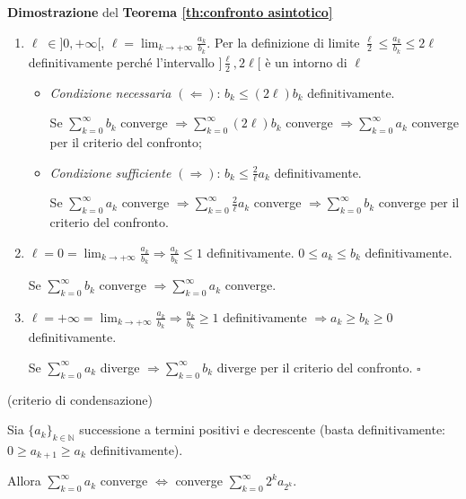 \begin{dembar}
	\textbf{Dimostrazione} del \textbf{Teorema \ref{th:confronto asintotico}}
	\begin{enumerate}
		\item $\ell \; \in ]0,+\infty[$, $\ell = \lim_{k\rightarrow+\infty} \frac{a_k}{b_k}$. Per la definizione di limite $\frac{\ell}{2} \leq \frac{a_k}{b_k} \leq 2\ell$ definitivamente perché l'intervallo $]\frac{\ell}{2}, 2\ell[$ è un intorno di $\ell$
		\begin{itemize}
			\item \textit{Condizione necessaria $(\Leftarrow)$}: $b_k \leq (2\ell) b_k$ definitivamente. 
			
			Se $\sum_{k=0}^\infty b_k$ converge $\Rightarrow \sum_{k=0}^\infty (2\ell) b_k$ converge $\Rightarrow \sum_{k=0}^\infty a_k$ converge per il criterio del confronto;
			
			\item \textit{Condizione sufficiente $(\Rightarrow)$}: $b_k \leq \frac{2}{\ell} a_k$ definitivamente.
			
			Se $\sum_{k=0}^\infty a_k$ converge $\Rightarrow \sum_{k=0}^\infty \frac{2}{\ell} a_k$ converge $\Rightarrow \sum_{k=0}^{\infty} b_k$ converge per il criterio del confronto.
		\end{itemize}
		
		\item $\ell=0=\lim_{k\rightarrow+\infty} \frac{a_k}{b_k} \Rightarrow \frac{a_k}{b_k} \leq 1$ definitivamente. $0 \leq a_k \leq b_k$ definitivamente. 
		
		Se $\sum_{k=0}^\infty b_k$ converge $\Rightarrow \sum_{k=0}^\infty a_k$ converge.
		
		\item $\ell = +\infty = \lim_{k\rightarrow+\infty} \frac{a_k}{b_k} \Rightarrow \frac{a_k}{b_k} \geq 1$ definitivamente $\Rightarrow a_k \geq b_k \geq 0$ definitivamente.
		
		Se $\sum_{k=0}^\infty a_k$ diverge $\Rightarrow \sum_{k=0}^\infty b_k$ diverge per il criterio del confronto. $\square$
	\end{enumerate}
\end{dembar}

\begin{theorem} (criterio di condensazione)
	
	Sia $\{a_k \}_{k\in\mathbb{N}}$ successione a termini positivi e decrescente (basta definitivamente: $0\geq a_{k+1} \geq a_k$ definitivamente). 
	
	Allora $\sum_{k=0}^\infty a_k$ converge $\iff$ converge $\sum_{k=0}^\infty 2^k a_{2^k}$.
\end{theorem}


